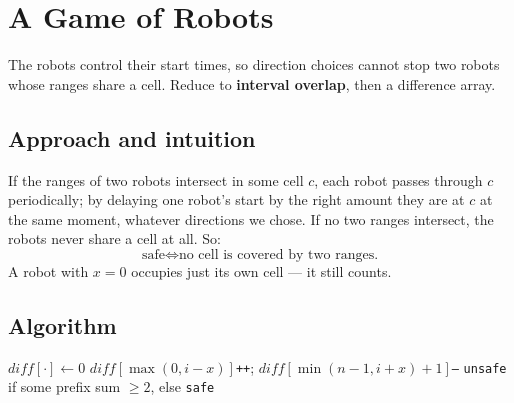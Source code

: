 \section{A Game of Robots}
\label{sec:g-robots}


\begin{patternbox}
The robots control their start times, so direction choices cannot stop two
robots whose ranges share a cell. Reduce to \textbf{interval overlap}, then a
difference array.
\end{patternbox}

\subsection*{Approach and intuition}

If the ranges of two robots intersect in some cell $c$, each robot passes
through $c$ periodically; by delaying one robot's start by the right amount
they are at $c$ at the same moment, whatever directions we chose. If no two
ranges intersect, the robots never share a cell at all. So:
\[
  \text{safe}\iff\text{no cell is covered by two ranges.}
\]
A robot with $x=0$ occupies just its own cell --- it still counts.

\subsection*{Algorithm}
\begin{algorithmic}[1]
\State $diff[\cdot]\gets0$
 \State $diff[\max(0,i-x)]$\texttt{++}; $diff[\min(n-1,i+x)+1]$\texttt{--} \EndFor
\State \Return \texttt{unsafe} if some prefix sum $\ge2$, else \texttt{safe}
\end{algorithmic}


